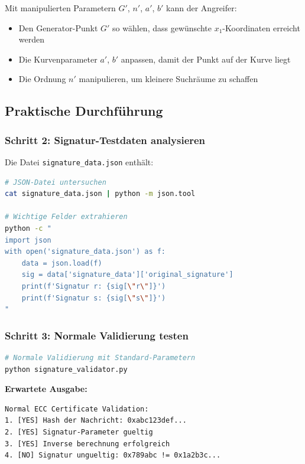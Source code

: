 \documentclass{article}
\begin{document}
Mit manipulierten Parametern $G'$, $n'$, $a'$, $b'$ kann der Angreifer:
\begin{itemize}
    \item Den Generator-Punkt $G'$ so wählen, dass gewünschte $x_1$-Koordinaten erreicht werden
    \item Die Kurvenparameter $a'$, $b'$ anpassen, damit der Punkt auf der Kurve liegt
    \item Die Ordnung $n'$ manipulieren, um kleinere Suchräume zu schaffen
\end{itemize}

\subsection{Praktische Durchführung}

\subsubsection{Schritt 2: Signatur-Testdaten analysieren}

Die Datei \texttt{signature\_data.json} enthält:

\begin{lstlisting}[language=bash, caption=Analyse der Testdaten]
# JSON-Datei untersuchen
cat signature_data.json | python -m json.tool

# Wichtige Felder extrahieren
python -c "
import json
with open('signature_data.json') as f:
    data = json.load(f)
    sig = data['signature_data']['original_signature']
    print(f'Signatur r: {sig[\"r\"]}')
    print(f'Signatur s: {sig[\"s\"]}')
"
\end{lstlisting}

\subsubsection{Schritt 3: Normale Validierung testen}

\begin{lstlisting}[language=bash, caption=Baseline-Validierung]
# Normale Validierung mit Standard-Parametern
python signature_validator.py
\end{lstlisting}

\textbf{Erwartete Ausgabe:}
\begin{lstlisting}[caption=Normale Validierung]
Normal ECC Certificate Validation:
1. [YES] Hash der Nachricht: 0xabc123def...
2. [YES] Signatur-Parameter gueltig
3. [YES] Inverse berechnung erfolgreich  
4. [NO] Signatur ungueltig: 0x789abc != 0x1a2b3c...
\end{lstlisting}
\end{document}
